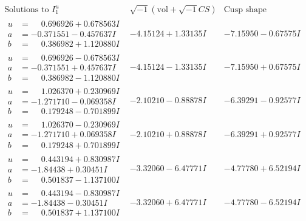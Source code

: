 \documentclass[1p]{elsarticle_modified}
\theoremstyle{definition}
\newcommand{\I}{\sqrt{-1}}
\begin{document}
$$\begin{array}{c|c|c}  
\text{Solutions to }I^u_{1}& \I (\text{vol} + \sqrt{-1}CS) & \text{Cusp shape}\\
 \hline 
\begin{aligned}
u &= \phantom{-}0.696926 + 0.678563 I \\
a &= -0.371551 - 0.457637 I \\
b &= \phantom{-}0.386982 + 1.120880 I\end{aligned}
 & -4.15124 + 1.33135 I & -7.15950 - 0.67575 I \\ \hline\begin{aligned}
u &= \phantom{-}0.696926 - 0.678563 I \\
a &= -0.371551 + 0.457637 I \\
b &= \phantom{-}0.386982 - 1.120880 I\end{aligned}
 & -4.15124 - 1.33135 I & -7.15950 + 0.67575 I \\ \hline\begin{aligned}
u &= \phantom{-}1.026370 + 0.230969 I \\
a &= -1.271710 - 0.069358 I \\
b &= \phantom{-}0.179248 - 0.701899 I\end{aligned}
 & -2.10210 - 0.88878 I & -6.39291 - 0.92577 I \\ \hline\begin{aligned}
u &= \phantom{-}1.026370 - 0.230969 I \\
a &= -1.271710 + 0.069358 I \\
b &= \phantom{-}0.179248 + 0.701899 I\end{aligned}
 & -2.10210 + 0.88878 I & -6.39291 + 0.92577 I \\ \hline\begin{aligned}
u &= \phantom{-}0.443194 + 0.830987 I \\
a &= -1.84438 + 0.30451 I \\
b &= \phantom{-}0.501837 - 1.137100 I\end{aligned}
 & -3.32060 - 6.47771 I & -4.77780 + 6.52194 I \\ \hline\begin{aligned}
u &= \phantom{-}0.443194 - 0.830987 I \\
a &= -1.84438 - 0.30451 I \\
b &= \phantom{-}0.501837 + 1.137100 I\end{aligned}
 & -3.32060 + 6.47771 I & -4.77780 - 6.52194 I \\ \hline\begin{aligned}

\end{aligned}
\end{array}$$
\end{document}
